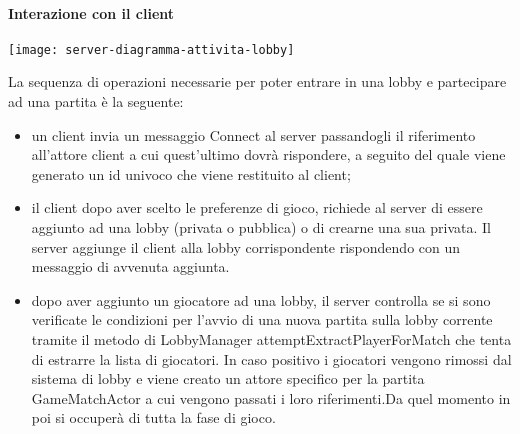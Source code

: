 \paragraph{Interazione con il client}
\begin{center}
    \texttt{[image: server-diagramma-attivita-lobby]}
\end{center}
La sequenza di operazioni necessarie per poter entrare in una lobby e partecipare ad una partita è la seguente:
\begin{itemize}
    \item un client invia un messaggio Connect al server passandogli il riferimento all’attore client a cui quest’ultimo dovrà rispondere, a seguito del quale viene generato un id univoco che viene restituito al client;
    \item il client dopo aver scelto le preferenze di gioco, richiede al server di essere aggiunto ad una lobby (privata o pubblica) o di crearne una sua privata.
    Il server aggiunge il client alla lobby corrispondente rispondendo con un messaggio di avvenuta aggiunta.
    \item dopo aver aggiunto un giocatore ad una lobby, il server controlla se si sono verificate le condizioni per l’avvio di una nuova partita sulla lobby corrente tramite il metodo di LobbyManager attemptExtractPlayerForMatch che tenta di estrarre la lista di giocatori.
    In caso positivo i giocatori vengono rimossi dal sistema di lobby e viene creato un attore specifico per la partita GameMatchActor a cui vengono passati i loro riferimenti.Da quel momento in poi si occuperà di tutta la fase di gioco.
\end{itemize}

